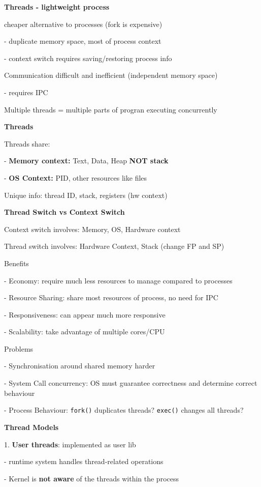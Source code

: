 \documentclass[10pt, a4paper]{article}
\newcommand{\highlight}[1]{{\color{red}\textbf{#1}}}
\newcommand{\red}[1]{{\color{red}#1}}
\newcommand{\green}[1]{{\color{ForestGreen}#1}}
\newcommand{\header}[1]{{\normalsize\textbf{#1}}}
\begin{document}
\begin{multicols*}{3}
		\header{Threads - lightweight process}

		cheaper alternative to processes (fork is expensive)

		- duplicate memory space, most of process context

		- context switch requires saving/restoring process info

		Communication difficult and inefficient (independent memory space)

		- requires IPC

		Multiple threads = multiple parts of progran executing concurrently

		\textbf{Threads}

		Threads share:

		- \textbf{Memory context:} Text, Data, Heap \highlight{NOT stack}

		- \textbf{OS Context:} PID, other resources like files

		Unique info: thread ID, stack, registers (hw context)

		\textbf{Thread Switch vs Context Switch}

		\red{Context switch} involves: Memory, OS, Hardware context

		\green{Thread switch} involves: Hardware Context, Stack (change FP and SP)

		\green{Benefits}

		- Economy: require much less resources to manage compared to processes

		- Resource Sharing: share most resources of process, no need for IPC 

		- Responsiveness: can appear much more responsive

		- Scalability: take advantage of multiple cores/CPU

		\red{Problems}

		- Synchronisation around shared memory harder

		- System Call concurrency: OS must guarantee correctness and determine correct behaviour

		- Process Behaviour: \texttt{fork()} duplicates threads? \texttt{exec()} changes all threads?

		\textbf{Thread Models}

		1. \textbf{User threads}: implemented as user lib

		- runtime system handles thread-related operations

		- Kernel is \highlight{not aware} of the threads within the process


\end{multicols*}
\end{document}
